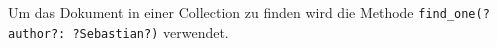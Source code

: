 Um das Dokument in einer Collection zu finden wird die Methode \lstinline{find_one(?author?: ?Sebastian?)} verwendet.
